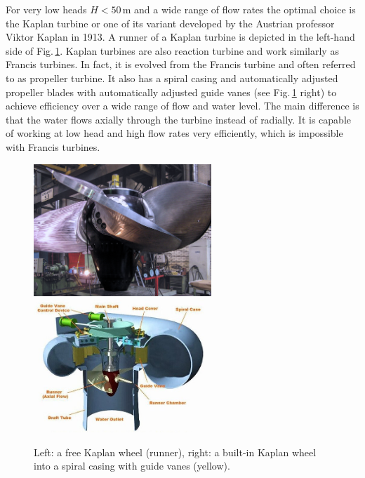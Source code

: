 For very low heads $H<50\,\mathrm{m}$ and a wide range of flow rates the optimal choice is the Kaplan turbine or one of its variant developed by the Austrian professor Viktor Kaplan in 1913. A runner of a Kaplan turbine is depicted in the left-hand side of Fig.\,\ref{Fig:kaplan_turbine}. Kaplan turbines are also reaction turbine and work similarly as Francis turbines. In fact, it is evolved from the Francis turbine and often referred to as propeller turbine. It also has a spiral casing and automatically adjusted propeller blades with automatically adjusted guide vanes (see Fig.\,\ref{Fig:kaplan_turbine} right) to achieve efficiency over a wide range of flow and water level. The main difference is that the water flows axially through the turbine instead of radially. It is capable of working at low head and high flow rates very efficiently, which is impossible with Francis turbines.

\begin{figure}[ht!]
	\centering
		\includegraphics[height=5cm]{HydroAndWindPower/Figures/Kaplan_Turbine_1.jpg}
		\includegraphics[height=5cm]{HydroAndWindPower/Figures/Kaplan_Turbine_3.jpg}
	\caption{Left: a free Kaplan wheel (runner), right: a built-in Kaplan wheel into a spiral casing with guide vanes (yellow).}
	\label{Fig:kaplan_turbine}
\end{figure}

